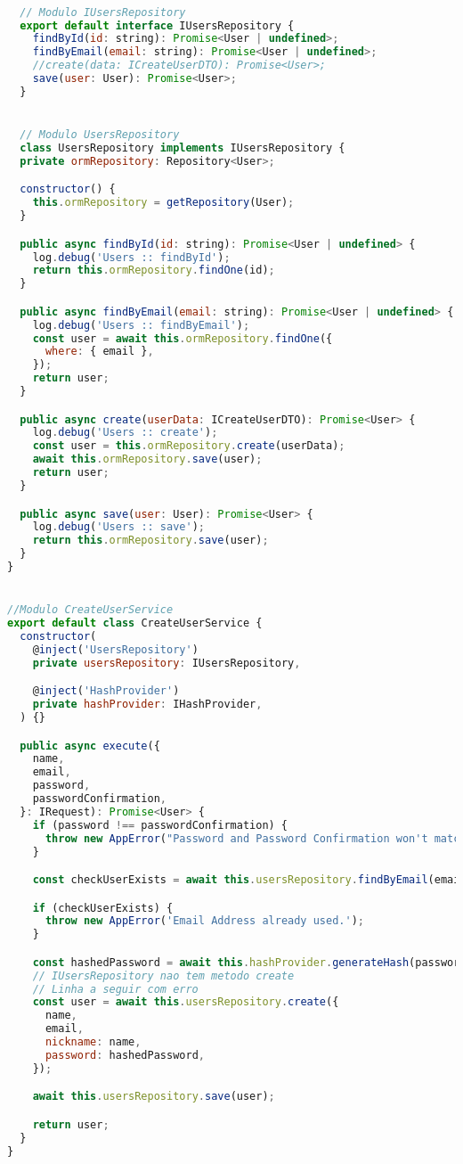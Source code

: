 \begin{lstlisting}[language=JavaScript, caption={Violando o LSP},captionpos=b, label=alg:lspviolation]

  // Modulo IUsersRepository
  export default interface IUsersRepository {
    findById(id: string): Promise<User | undefined>;
    findByEmail(email: string): Promise<User | undefined>;
    //create(data: ICreateUserDTO): Promise<User>;
    save(user: User): Promise<User>;
  }


  // Modulo UsersRepository
  class UsersRepository implements IUsersRepository {
  private ormRepository: Repository<User>;

  constructor() {
    this.ormRepository = getRepository(User);
  }

  public async findById(id: string): Promise<User | undefined> {
    log.debug('Users :: findById');
    return this.ormRepository.findOne(id);
  }

  public async findByEmail(email: string): Promise<User | undefined> {
    log.debug('Users :: findByEmail');
    const user = await this.ormRepository.findOne({
      where: { email },
    });
    return user;
  }

  public async create(userData: ICreateUserDTO): Promise<User> {
    log.debug('Users :: create');
    const user = this.ormRepository.create(userData);
    await this.ormRepository.save(user);
    return user;
  }

  public async save(user: User): Promise<User> {
    log.debug('Users :: save');
    return this.ormRepository.save(user);
  }
}


//Modulo CreateUserService
export default class CreateUserService {
  constructor(
    @inject('UsersRepository')
    private usersRepository: IUsersRepository,

    @inject('HashProvider')
    private hashProvider: IHashProvider,
  ) {}

  public async execute({
    name,
    email,
    password,
    passwordConfirmation,
  }: IRequest): Promise<User> {
    if (password !== passwordConfirmation) {
      throw new AppError("Password and Password Confirmation won't match");
    }

    const checkUserExists = await this.usersRepository.findByEmail(email);

    if (checkUserExists) {
      throw new AppError('Email Address already used.');
    }

    const hashedPassword = await this.hashProvider.generateHash(password);
    // IUsersRepository nao tem metodo create
    // Linha a seguir com erro
    const user = await this.usersRepository.create({ 
      name,
      email,
      nickname: name,
      password: hashedPassword,
    });

    await this.usersRepository.save(user);

    return user;
  }
}

  \end{lstlisting}